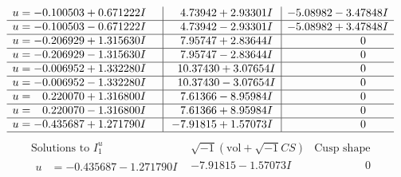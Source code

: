 \documentclass[1p]{elsarticle_modified}
\theoremstyle{definition}
\newcommand{\I}{\sqrt{-1}}
\begin{document}
$$\begin{array}{c|c|c}
\begin{aligned}
u &= -0.100503 + 0.671222 I\end{aligned}
 & \phantom{-}4.73942 + 2.93301 I & -5.08982 - 3.47848 I \\ \hline\begin{aligned}
u &= -0.100503 - 0.671222 I\end{aligned}
 & \phantom{-}4.73942 - 2.93301 I & -5.08982 + 3.47848 I \\ \hline\begin{aligned}
u &= -0.206929 + 1.315630 I\end{aligned}
 & \phantom{-}7.95747 + 2.83644 I & \phantom{-0.000000 } 0 \\ \hline\begin{aligned}
u &= -0.206929 - 1.315630 I\end{aligned}
 & \phantom{-}7.95747 - 2.83644 I & \phantom{-0.000000 } 0 \\ \hline\begin{aligned}
u &= -0.006952 + 1.332280 I\end{aligned}
 & \phantom{-}10.37430 + 3.07654 I & \phantom{-0.000000 } 0 \\ \hline\begin{aligned}
u &= -0.006952 - 1.332280 I\end{aligned}
 & \phantom{-}10.37430 - 3.07654 I & \phantom{-0.000000 } 0 \\ \hline\begin{aligned}
u &= \phantom{-}0.220070 + 1.316800 I\end{aligned}
 & \phantom{-}7.61366 - 8.95984 I & \phantom{-0.000000 } 0 \\ \hline\begin{aligned}
u &= \phantom{-}0.220070 - 1.316800 I\end{aligned}
 & \phantom{-}7.61366 + 8.95984 I & \phantom{-0.000000 } 0 \\ \hline\begin{aligned}
u &= -0.435687 + 1.271790 I\end{aligned}
 & -7.91815 + 1.57073 I & \phantom{-0.000000 } 0\\
 \hline 
 \end{array}$$\newpage$$\begin{array}{c|c|c}  
\text{Solutions to }I^u_{1}& \I (\text{vol} + \sqrt{-1}CS) & \text{Cusp shape}\\
 \hline 
\begin{aligned}
u &= -0.435687 - 1.271790 I\end{aligned}
 & -7.91815 - 1.57073 I & \phantom{-0.000000 } 0 \\ \hline\begin{aligned}

\end{aligned}
\end{array}$$
\end{document}
